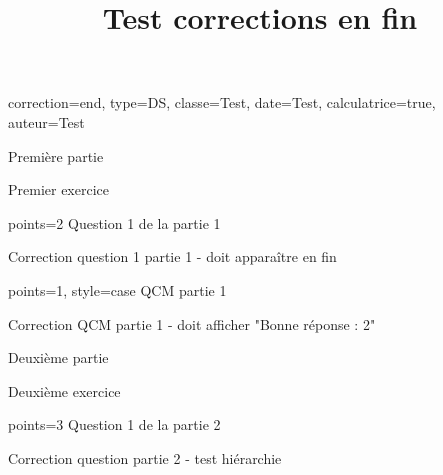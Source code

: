 \documentclass{nfdevoirs}
\title{Test corrections en fin}
\begin{document}
\begin{devoir}{
    correction=end,
    type=DS,
    classe={Test},
    date={Test},
    calculatrice=true,
    auteur={Test}
}

\begin{partie}{Première partie}

    \begin{exercice}{Premier exercice}

        \begin{question}{points=2}
            Question 1 de la partie 1
        \end{question}

        \begin{correction}
            Correction question 1 partie 1 - doit apparaître en fin
        \end{correction}

        \begin{qcm}{points=1, style=case}
            QCM partie 1
            \begin{choix}
            \end{choix}
        \end{qcm}

        \begin{correction}
            Correction QCM partie 1 - doit afficher "Bonne réponse : 2"
        \end{correction}

    \end{exercice}

\end{partie}

\begin{partie}{Deuxième partie}

    \begin{exercice}{Deuxième exercice}

        \begin{question}{points=3}
            Question 1 de la partie 2
        \end{question}

        \begin{correction}
            Correction question partie 2 - test hiérarchie
        \end{correction}

    \end{exercice}

\end{partie}

\end{devoir}
\end{document}
